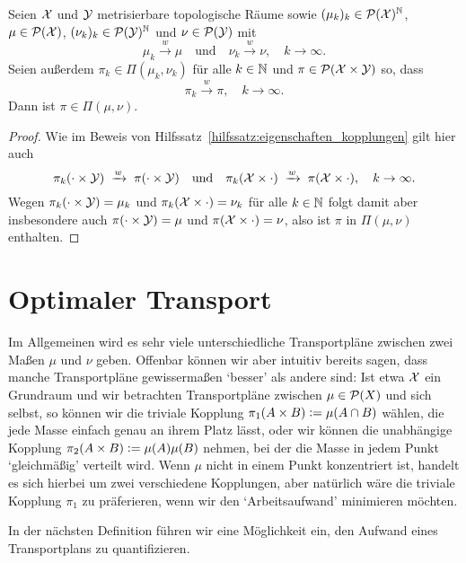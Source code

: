 \documentclass[../thesis/thesis.tex]{subfiles}
\begin{document}
	\begin{Hilfssatz}
		\label{hilfssatz:konvergenz_kopplungen}
		Seien $\mathcal{X}$ und $\mathcal{Y}$ metrisierbare topologische Räume sowie $(\mu_k)_k \in \mathcal{P}(\mathcal{X})^{\mathbb{N}}$, $\mu \in \mathcal{P}(\mathcal{X})$, $(\nu_k)_k \in \mathcal{P}(\mathcal{Y})^{\mathbb{N}}$ und $\nu \in \mathcal{P}(\mathcal{Y})$ mit
		\[ \mu_k \xrightarrow{w} \mu \quad \text{und} \quad \nu_k \xrightarrow{w} \nu, \quad k \to \infty \text{.} \]
		Seien außerdem $\pi_k \in \Pi(\mu_k, \nu_k)$ für alle $k \in \mathbb{N}$ und $\pi \in \mathcal{P}(\mathcal{X} \times \mathcal{Y})$ so, dass
		\[ \pi_k \xrightarrow{w} \pi, \quad k \to \infty \text{.} \]
		Dann ist $\pi \in \Pi(\mu, \nu)$.
	\end{Hilfssatz}

	\begin{proof}
		Wie im Beweis von Hilfssatz~\ref{hilfssatz:eigenschaften_kopplungen} gilt hier auch
		\[ \pi_k(\cdot \times \mathcal{Y}) \; \xrightarrow{w} \; \pi(\cdot \times \mathcal{Y}) \quad \text{und} \quad \pi_k(\mathcal{X} \times \cdot) \; \xrightarrow{w} \; \pi(\mathcal{X} \times \cdot), \quad k \to \infty \text{.} \]
		Wegen $\pi_k(\cdot \times \mathcal{Y}) = \mu_k$ und $\pi_k(\mathcal{X} \times \cdot) = \nu_k$ für alle $k \in \mathbb{N}$ folgt damit aber insbesondere auch $\pi(\cdot \times \mathcal{Y}) = \mu$ und $\pi(\mathcal{X} \times \cdot) = \nu$, also
		ist $\pi$ in $\Pi(\mu, \nu)$ enthalten.
	\end{proof}

	\section{Optimaler Transport}
	\label{subsec:optimaler_transport}
	
	Im Allgemeinen wird es sehr viele unterschiedliche Transportpläne zwischen zwei Maßen $\mu$ und $\nu$ geben. Offenbar können wir aber intuitiv bereits sagen, dass manche Transportpläne gewissermaßen
	\enquote*{besser} als andere sind: Ist etwa $\mathcal{X}$ ein Grundraum und wir betrachten Transportpläne zwischen $\mu \in \mathcal{P}(X)$ und sich selbst, so können wir die triviale Kopplung $\pi_1(A \times B) \vcentcolon = \mu(A \cap B)$ wählen, 
	die jede Masse einfach genau an ihrem Platz lässt, oder wir können die unabhängige Kopplung $\pi_2(A \times B) \vcentcolon = \mu(A) \mu(B)$ nehmen, bei der die Masse in jedem Punkt \enquote*{gleichmäßig} 
	verteilt wird. Wenn $\mu$ nicht in einem Punkt konzentriert ist, handelt es sich hierbei um zwei verschiedene Kopplungen, aber natürlich wäre die triviale Kopplung $\pi_1$ zu präferieren, wenn wir den
	\enquote*{Arbeitsaufwand} minimieren möchten. 
	
	In der nächsten Definition führen wir eine Möglichkeit ein, den Aufwand eines Transportplans zu quantifizieren.
\end{document}
